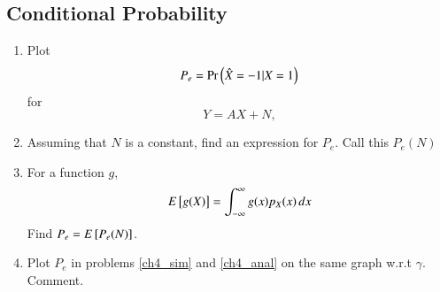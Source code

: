 \documentclass[journal,12pt,twocolumn]{IEEEtran}
\renewcommand\thesection{\arabic{section}}
\begin{document}
\begin{enumerate}[label=\thesection.\arabic*
,ref=\thesection.\theenumi]
\section{Conditional Probability}
\begin{enumerate}[label=\thesection.\arabic*
,ref=\thesection.\theenumi]
\item
\label{ch4_sim}
Plot
\begin{equation}
P_e = \Pr\left(\hat{X} = -1|X=1\right)
\end{equation}
%
for
\begin{equation}
Y = AX+N,
\end{equation}
%
\item
Assuming that $N$ is a constant, find an expression for $P_e$.  Call this $P_e(N)$
%
\item
%
\label{ch4_anal}
For a function $g$,
\begin{equation}
E{}\left[g(X)\right] = \int_{-\infty}^{\infty}g(x)p_{X}(x)\, dx
\end{equation}
%
Find $P_e = E{}\left[P_e(N)\right]$.
%
\item
Plot $P_e$ in problems \ref{ch4_sim} and \ref{ch4_anal} on the same graph w.r.t $\gamma$.  Comment.
		\end{enumerate}

\end{enumerate}
\end{document}
